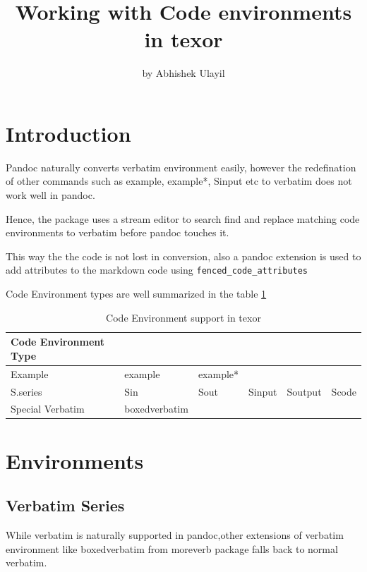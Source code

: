 \title{Working with Code environments in texor}
\author{by Abhishek Ulayil}

\maketitle


\section{Introduction}

Pandoc naturally converts verbatim environment easily, however the redefination of other commands such as example, example*, Sinput etc to verbatim does not work well in pandoc.

Hence, the  package uses a stream editor to search find and replace matching code environments to verbatim before pandoc touches it.

This way the the code is not lost in conversion, also a pandoc extension is used to add attributes to the markdown code using  \verb|fenced_code_attributes|

Code Environment types are well summarized in the table \ref{table:1}

\begin{table}[htbp]
\centering
\begin{tabular}{l | lllll }
 \hline
 Code Environment Type &  &  &  & & \\
 \hline
 Example          & example & example* &  & & \\
 S.series         & Sin & Sout & Sinput & Soutput & Scode \\
 Special Verbatim & boxedverbatim & &  & & \\
\hline
\end{tabular}
\caption{Code Environment support in texor}
\label{table:1}
\end{table}


\section{Environments}

\subsection{Verbatim Series}
While verbatim is naturally supported in pandoc,other extensions of verbatim environment
like boxedverbatim from moreverb package \citep{moreverb} falls back to normal verbatim.

